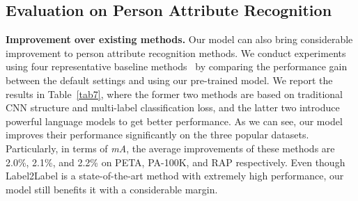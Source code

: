 \documentclass[10pt,twocolumn,letterpaper]{article}
\begin{document}
\subsection{Evaluation on Person Attribute Recognition}
\noindent\textbf{Improvement over existing methods.}
Our model can also bring considerable improvement to person attribute recognition methods. We conduct experiments using four representative baseline methods~\cite{a1,rethinking,VTB,Label2Label} by comparing the performance gain between the default settings and using our pre-trained model. We report the results in Table~\ref{tab7}, where the former two methods are based on traditional CNN structure and multi-label classification loss, and the latter two introduce powerful language models to get better performance. As we can see, our model improves their performance significantly on the three popular datasets. Particularly, in terms of \textit{mA}, the average improvements of these methods are 2.0\%, 2.1\%, and 2.2\% on PETA, PA-100K, and RAP respectively. Even though Label2Label is a state-of-the-art method with extremely high performance, our model still benefits it with a considerable margin.
\begin{table}[t]
\centering
\caption{Improving four person attribute recognition baseline methods, with results shown in \textit{mA/F1}. The results of DeepMAR are from a re-implementation by replacing the backbone with ResNet50, which are much better than the original. The underlined results are not shown in the original paper, which are re-produced by the official code.}
\label{tab7}
\end{table}
\end{document}
